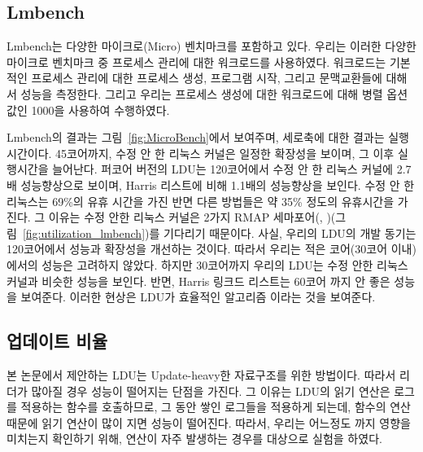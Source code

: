 \subsection{Lmbench}
Lmbench는 다양한 마이크로(Micro) 벤치마크를 포함하고 있다. 
우리는 이러한 다양한 마이크로 벤치마크 중 프로세스 관리에 대한 워크로드를 사용하였다. 
워크로드는 기본적인 프로세스 관리에 대한 프로세스 생성, 
프로그램 시작, 그리고 문맥교환들에 대해서 성능을 측정한다.
그리고 우리는 프로세스 생성에 대한 워크로드에 대해 병렬 옵션 값인 1000을 사용하여 수행하였다. 

Lmbench의 결과는 그림~\ref{fig:MicroBench}에서 보여주며, 세로축에 대한 결과는 실행 시간이다.
45코어까지, 수정 안 한 리눅스 커널은 일정한 확장성을 보이며, 그 이후 실행시간을 늘어난다.
퍼코어 버전의 LDU는 120코어에서 수정 안 한 리눅스 커널에 2.7배 성능향상으로 보이며, 
Harris 리스트에 비해 1.1배의 성능향상을 보인다.
수정 안 한 리눅스는 69\%의 유휴 시간을 가진 반면 다른 방법들은 약 35\% 정도의 유휴시간을 가진다.
그 이유는 수정 안한 리눅스 커널은 2가지 RMAP 세마포어(,
)(그림~\ref{fig:utilization_lmbench})를 기다리기 때문이다. 
사실, 우리의 LDU의 개발 동기는 120코어에서 성능과 확장성을 개선하는 것이다. 
따라서 우리는 적은 코어(30코어 이내)에서의 성능은 고려하지 않았다.
하지만 30코어까지 우리의 LDU는 수정 안한 리눅스 커널과 비슷한 성능을 보인다. 
반면, Harris 링크드 리스트는 60코어 까지 안 좋은 성능을 보여준다. 
이러한 현상은 LDU가 효율적인 알고리즘 이라는 것을 보여준다.

\subsection{업데이트 비율}

본 논문에서 제안하는 LDU는 Update-heavy한 자료구조를 위한 방법이다. 
따라서 리더가 많아질 경우 성능이 떨어지는 단점을 가진다. 
그 이유는 LDU의 읽기 연산은 로그를 적용하는  함수를 호출하므로, 
그 동안 쌓인 로그들을 적용하게 되는데,  함수의 
연산 때문에 읽기 연산이 많이 지면 성능이 떨어진다.
따라서, 우리는 어느정도 까지 영향을 미치는지 확인하기 위해, 연산이 자주 발생하는 경우를 
대상으로 실험을 하였다. 

